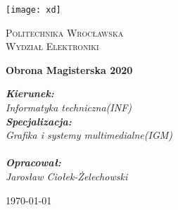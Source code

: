 \begin{titlepage}
	\centering
	\texttt{[image: xd]}\par\vspace{1cm}
	{\scshape\LARGE Politechnika Wrocławska\\ Wydział Elektroniki \par}
	\vspace{2.5cm}
	{\huge\bfseries Obrona Magisterska 2020\par}
	\vspace{2cm}
	{\Large\itshape \textbf{Kierunek:}\\Informatyka techniczna(INF) \\ \textbf{Specjalizacja:}\\Grafika i systemy multimedialne(IGM) \\\\ \textbf{Opracował:}\\Jarosław Ciołek-Żelechowski\par}
	
	\vfill
	
	{\large \today\par}
\end{titlepage}